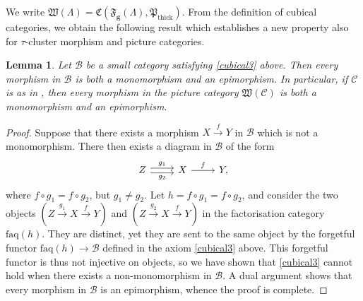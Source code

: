 \documentclass[10pt,twoside, a4paper,reqno]{amsart}
\DeclareMathOperator{\thick}{thick}
\newcommand{\partfan}[1]{\mathfrak{F}_{\bfg}(#1)}
\newcommand{\catof}{\mathfrak{C}}
\newcommand{\tcmc}[1]{\mathfrak{W}(#1)}
\newcommand{\Wfrak}{\mathfrak{W}}
\newcommand{\Pfrak}{\mathfrak{P}}
\newcommand{\calB}{\mathcal{B}}
\newcommand{\calC}{\mathcal{C}}
\newcommand{\bfg}{\mathbf{g}}
\newtheorem{lemma}[theorem]{Lemma}
\theoremstyle{definition}
\begin{document}
We write $\Wfrak(\Lambda) = \catof(\partfan{\Lambda}, \Pfrak_{\thick})$.
From the definition of cubical categories, we obtain the following result which establishes a new property also for $\tau$-cluster morphism and picture categories.

\begin{lemma}\label{lem:monoepi}
    Let $\calB$ be a small category satisfying \ref{cubical3} above. Then every morphism in $\calB$ is both a monomorphism and an epimorphism. In particular, if $\calC$ is as in , then every morphism in the picture category $\tcmc{\calC}$ is both a monomorphism and an epimorphism. 
\end{lemma}
\begin{proof}
    Suppose that there exists a morphism $X\xrightarrow{f} Y$ in $\calB$ {which} is {not} a monomorphism. There then exists a diagram in $\calB$ of the form
    \begin{equation}\label{eq:monoepi_nonmono}
        \begin{tikzcd}
Z \arrow[r, "g_1", shift left] \arrow[r, "g_2"', shift right] & X \arrow[r, "f"] & Y,
\end{tikzcd}
    \end{equation}
    where $f\circ g_1=f\circ g_2$, {but $g_1 \neq g_2$}. Let $h=f\circ g_1=f\circ g_2$, and consider the two objects $(Z \xrightarrow{g_1} X \xrightarrow{f} Y)$ and $(Z \xrightarrow{g_2} X \xrightarrow{f} Y)$ in the factorisation category $\mathrm{faq}(h)$. They are distinct, yet they are sent to the same object by the forgetful functor $\mathrm{faq}(h) \to \calB$ defined in the axiom \ref{cubical3} above.
    This forgetful functor is thus not injective on objects, so we have shown that \ref{cubical3} cannot hold when there exists a {non-}monomorphism in {$\calB$}.
    A dual argument shows that every morphism in $\calB$ is an epimorphism, whence the proof is complete.
\end{proof}
\end{document}
